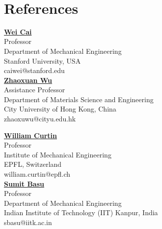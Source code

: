 \documentclass[margin,line]{resume}
\begin{document}
\begin{resume}
    ­%

    \section{\mysidestyle References}
    \begin{minipage}[t]{0.5\textwidth}
        \href{https://web.stanford.edu/~caiwei/}{\textbf{\textsf{Wei Cai}}}\\
        Professor\\
        Department of Mechanical Engineering\\
        Stanford University, USA \\
        caiwei@stanford.edu\\[1em]
        \href{https://scholars.cityu.edu.hk/en/persons/zhaoxuan-wu(32022051-be5f-44e8-84eb-794d8f78d35c).html}{\textbf{\textsf{Zhaoxuan Wu}}}\\
        Assistance Professor\\
        Department of Materials Science and Engineering\\
        City University of Hong Kong, China\\
        zhaoxuwu@cityu.edu.hk\\[1em]
    \end{minipage}
    \begin{minipage}[t]{0.5\textwidth}
        \href{https://people.epfl.ch//william.curtin?lang=en}{\textbf{\textsf{William Curtin}}}\\
        Professor\\
        Institute of Mechanical Engineering\\
        EPFL, Switzerland\\
        william.curtin@epfl.ch\\[1em]
        \href{http://home.iitk.ac.in/~sbasu/}{\textbf{\textsf{Sumit Basu}}}\\
        Professor\\
        Department of Mechanical Engineering\\
        Indian Institute of Technology (IIT) Kanpur, India\\
        sbasu@iitk.ac.in\\[1em]
    \end{minipage}

\end{resume}
\end{document}
